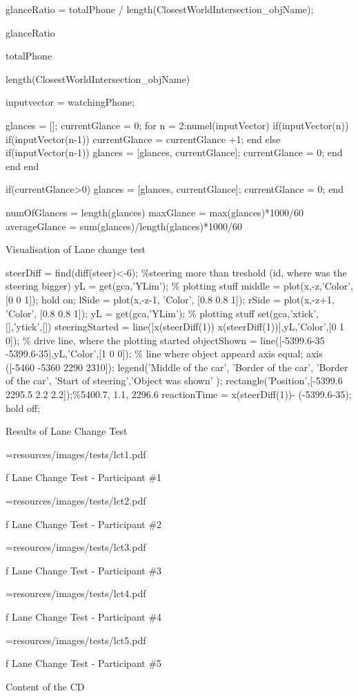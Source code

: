 glanceRatio = totalPhone / length(ClosestWorldIntersection_objName);

glanceRatio

totalPhone

length(ClosestWorldIntersection_objName)

inputvector = watchingPhone;

glances = [];
currentGlance = 0;
for n = 2:numel(inputVector)
    if(inputVector(n))
        if(inputVector(n-1))
            currentGlance = currentGlance +1;
        end
    else
        if(inputVector(n-1))
            glances = [glances, currentGlance];
            currentGlance = 0;
        end
    end
end


if(currentGlance>0)
    glances = [glances, currentGlance];
    currentGlance = 0;
end

numOfGlances = length(glances)
maxGlance = max(glances)*1000/60
averageGlance = sum(glances)/length(glances)*1000/60
\endtt

\secc Visualisation of Lane change test

\begtt

steerDiff = find(diff(steer)<-6); \%steering more than treshold (id, where was the steering bigger)
yL = get(gca,'YLim'); \% plotting stuff
middle = plot(x,-z,'Color',[0 0 1]);
hold on;
lSide = plot(x,-z-1, 'Color', [0.8 0.8 1]);
rSide = plot(x,-z+1, 'Color', [0.8 0.8 1]);
yL = get(gca,'YLim'); \% plotting stuff
set(gca,'xtick',[],'ytick',[])
steeringStarted = line([x(steerDiff(1)) x(steerDiff(1))],yL,'Color',[0 1 0]); \% drive line, where the plotting started
objectShown = line([-5399.6-35 -5399.6-35],yL,'Color',[1 0 0]); \% line where object appeard
axis equal;
axis ([-5460 -5360 2290 2310]);
legend('Middle of the car', 'Border of the car', 'Border of the car', 'Start of steering','Object was shown'  );
rectangle('Position',[-5399.6 2295.5 2.2 2.2]);\%5400.7, 1.1, 2296.6
reactionTime = x(steerDiff(1))- (-5399.6-35);
hold off;

\endtt

\sec Results of Lane Change Test

\midinsert {}
\picw=\hsize \cinspic resources/images/tests/lct1.pdf
\caption/f Lane Change Test - Participant \#1
\endinsert

\midinsert {}
\picw=\hsize \cinspic resources/images/tests/lct2.pdf
\caption/f Lane Change Test - Participant \#2
\endinsert

\midinsert {}
\picw=\hsize \cinspic resources/images/tests/lct3.pdf
\caption/f Lane Change Test - Participant \#3
\endinsert

\midinsert {}
\picw=\hsize \cinspic resources/images/tests/lct4.pdf
\caption/f Lane Change Test - Participant \#4
\endinsert

\midinsert {}
\picw=\hsize \cinspic resources/images/tests/lct5.pdf
\caption/f Lane Change Test - Participant \#5
\endinsert


\nextoddpage

\app Content of the CD

